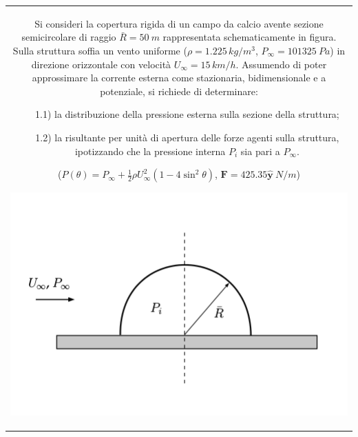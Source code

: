 \noindent
\begin{tabular}{c}
\begin{minipage}[b]{0.5\textwidth}
 \begin{exerciseS}
  Si consideri la copertura rigida di un campo da calcio avente sezione semicircolare di
  raggio $\bar{R}=50\ m$ rappresentata schematicamente in figura. Sulla struttura 
  soffia un vento uniforme ($\rho=1.225\,kg/m^3$, $P_\infty=101325\ Pa$) in direzione 
  orizzontale con velocit\`{a} $U_\infty=15\,km/h$. Assumendo di poter approssimare la corrente esterna 
  come stazionaria, bidimensionale e a potenziale, si richiede di determinare:
  \begin{itemize}
   \item[1.1)] la distribuzione della pressione esterna sulla sezione della struttura;
   \item[1.2)] la risultante per unit\`{a} di apertura delle forze agenti sulla struttura, 
               ipotizzando che la pressione interna $P_i$ sia pari a $P_\infty$.
  \end{itemize}
  \vspace{2mm}
($P(\theta) = P_\infty+\frac{1}{2}\rho U_\infty^2(1-4\sin^2\!\theta)$, $\bm{F} = 425.35\mathbf{\hat{\bm{y}}}\ N/m$)
  \end{exerciseS}
\end{minipage}
\hspace{3mm}
\begin{minipage}[b]{0.35\textwidth}
   \begin{center}
   \includegraphics[width=1.50\textwidth]{./fig/Cyl.png}
   \end{center}
\end{minipage}
\end{tabular}


